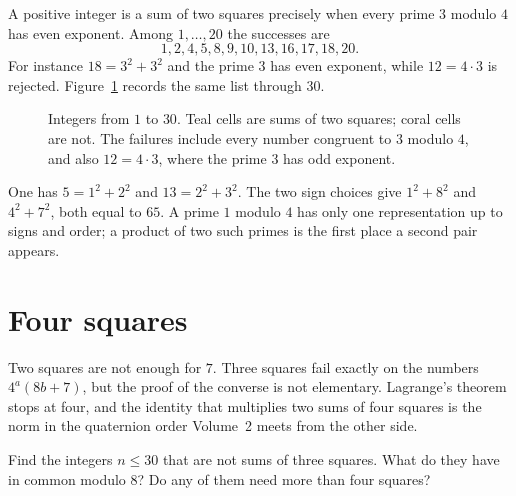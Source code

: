 \begin{examplex}
A positive integer is a sum of two squares precisely when every prime $3$ modulo $4$ has even exponent. Among $1,\ldots,20$ the successes are
\[
1,2,4,5,8,9,10,13,16,17,18,20.
\]
For instance $18=3^2+3^2$ and the prime $3$ has even exponent, while $12=4\cdot 3$ is rejected. Figure~\ref{fig:t1-representable} records the same list through $30$.
\end{examplex}

\begin{figure}[ht]
\centering
{}
\caption{Integers from $1$ to $30$. Teal cells are sums of two squares; coral cells are not. The failures include every number congruent to $3$ modulo $4$, and also $12=4\cdot 3$, where the prime $3$ has odd exponent.}
\label{fig:t1-representable}
\end{figure}

\begin{examplex}
One has $5=1^2+2^2$ and $13=2^2+3^2$. The two sign choices give $1^2+8^2$ and $4^2+7^2$, both equal to $65$. A prime $1$ modulo $4$ has only one representation up to signs and order; a product of two such primes is the first place a second pair appears.
\end{examplex}

\section{Four squares}

Two squares are not enough for $7$. Three squares fail exactly on the numbers $4^a(8b+7)$, but the proof of the converse is not elementary. Lagrange's theorem stops at four, and the identity that multiplies two sums of four squares is the norm in the quaternion order Volume~2 meets from the other side.

\begin{think}
Find the integers $n\le30$ that are not sums of three squares. What do they have in common modulo $8$? Do any of them need more than four squares?
\end{think}

